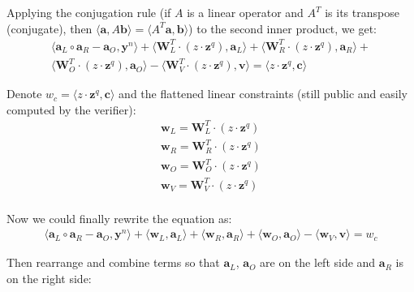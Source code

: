 \documentclass[../../book.tex]{subfiles}
\begin{document}
Applying the conjugation rule (if $A$ is a linear operator and $A^T$ is its transpose (conjugate), then $\langle \mathbf{a}, A \mathbf{b} \rangle = \langle A^T \mathbf{a}, \mathbf{b} \rangle$) to the second inner product, we get:
\begin{equation*}
    \begin{aligned}
        \langle \mathbf{a}_L \circ \mathbf{a}_R - \mathbf{a}_O, \mathbf{y}^n \rangle + \langle \mathbf{W}_L^T \cdot (z \cdot \mathbf{z}^q), \mathbf{a}_L \rangle + \langle \mathbf{W}_R^T \cdot (z \cdot \mathbf{z}^q), \mathbf{a}_R \rangle + \\
        \langle \mathbf{W}_O^T \cdot (z \cdot \mathbf{z}^q), \mathbf{a}_O \rangle - \langle \mathbf{W}_V^T \cdot (z \cdot \mathbf{z}^q), \mathbf{v} \rangle = \langle z \cdot \mathbf{z}^q, \mathbf{c} \rangle
    \end{aligned}
\end{equation*}

Denote $w_c = \langle z \cdot \mathbf{z}^q, \mathbf{c} \rangle$ and the flattened linear constraints (still public and easily computed by the verifier):
\begin{equation*}
    \begin{aligned}
        \mathbf{w}_L = \mathbf{W}_L^T \cdot (z \cdot \mathbf{z}^q) \\
        \mathbf{w}_R = \mathbf{W}_R^T \cdot (z \cdot \mathbf{z}^q) \\
        \mathbf{w}_O = \mathbf{W}_O^T \cdot (z \cdot \mathbf{z}^q) \\
        \mathbf{w}_V = \mathbf{W}_V^T \cdot (z \cdot \mathbf{z}^q) \\
    \end{aligned}
\end{equation*}

Now we could finally rewrite the equation as:
\begin{equation*}
    \begin{aligned}
        \langle \mathbf{a}_L \circ \mathbf{a}_R - \mathbf{a}_O, \mathbf{y}^n \rangle + \langle \mathbf{w}_L, \mathbf{a}_L \rangle + \langle \mathbf{w}_R, \mathbf{a}_R \rangle + \langle \mathbf{w}_O, \mathbf{a}_O \rangle - \langle \mathbf{w}_V, \mathbf{v} \rangle = w_c
    \end{aligned}
\end{equation*}

Then rearrange and combine terms so that $\mathbf{a}_L$, $\mathbf{a}_O$ are on the left side and $\mathbf{a}_R$ is on the right side:
\end{document}

